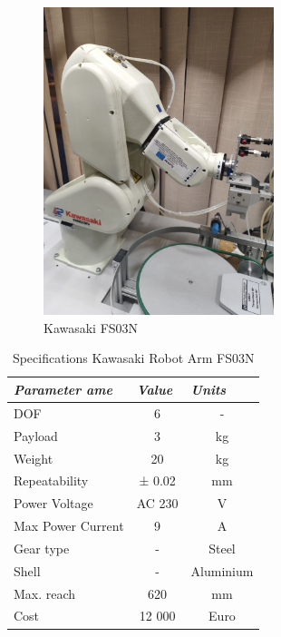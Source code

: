  \begin{figure}[H]
	\centering
	\includegraphics[width=0.6\textwidth]{Src/images/FS03N.jpg}
	\caption{Kawasaki FS03N}
    \label{ Kawasaki1}
\end{figure}



\begin{table}[H]
    \caption{Specifications Kawasaki Robot Arm FS03N}\label{tab:Kawasaki1}
    \centering
    \begin{tabular}{|l|c|c|}
        \hline
        \textit{\textbf{Parameter ame}} & \multicolumn{1}{l|}{\textit{\textbf{Value}}} & \multicolumn{1}{l|}{\textit{\textbf{Units}}} \\ \hline
        DOF                  & 6     & -     \\ \hline
        Payload              & 3 & kg    \\ \hline
        Weight               & 20   & kg    \\ \hline
        Repeatability        & ± 0.02 & mm    \\ \hline
        Power Voltage        & AC 230 & V     \\ \hline
        Max Power Current    & 9    & A     \\ \hline
        Gear type            & -     & Steel \\ \hline
        Shell                & -     & Aluminium \\ \hline
        Max. reach           & 620     & mm \\ \hline
        Cost                 & 12 000     & Euro \\ \hline
        \end{tabular}
 \end{table}

